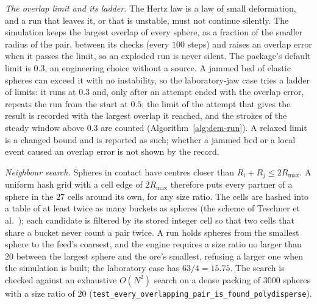 \emph{The overlap limit and its ladder.} The Hertz law is a law of small deformation, and a run that leaves it, or that is unstable, must not continue silently. The
simulation keeps the largest overlap of every sphere, as a fraction of the smaller radius of the pair, between its checks (every $100$ steps) and raises an overlap error
when it passes the limit, so an exploded run is never silent. The package's default limit is $0.3$, an engineering choice without a source. A jammed bed of elastic
spheres can exceed it with no instability, so the laboratory-jaw case tries a ladder of limits: it runs at $0.3$ and, only after an attempt ended with the overlap
error, repeats the run from the start at $0.5$; the limit of the attempt that gives the result is recorded with the largest overlap it reached, and the strokes of the
steady window above $0.3$ are counted (Algorithm~\ref{alg:dem-run}). A relaxed limit is a changed bound and is reported as such; whether a jammed bed or a local
event caused an overlap error is not shown by the record.

\emph{Neighbour search.} Spheres in contact have centres closer than $R_i+R_j\le2R_{\max}$. A uniform hash grid with a cell edge of $2R_{\max}$ therefore puts every partner of a sphere
in the $27$ cells around its own, for any size ratio. The cells are hashed into a table of at least twice as many buckets as spheres (the scheme of Teschner et al.~\cite{teschner2003}); each candidate is
filtered by its stored integer cell so that two cells that share a bucket never count a pair twice. A run holds spheres from the smallest sphere to the feed's coarsest, and the
engine requires a size ratio no larger than $20$ between the largest sphere and the ore's smallest, refusing a larger one when the simulation is built; the laboratory case has $63/4=15.75$. The search
is checked against an exhaustive $O(N^2)$ search on a dense packing of $3000$ spheres with a size ratio of $20$ (\texttt{test\_every\_overlapping\_pair\_is\_found\_polydisperse}).

